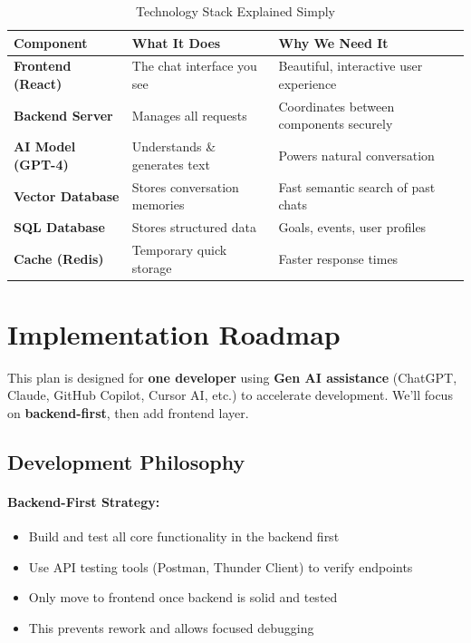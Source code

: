 \documentclass[12pt,a4paper]{article}
\begin{document}
\begin{table}[h]
\centering
\begin{tabularx}{\textwidth}{|l|X|X|}
\hline
\textbf{Component} & \textbf{What It Does} & \textbf{Why We Need It} \\
\hline
\textbf{Frontend (React)} & The chat interface you see & Beautiful, interactive user experience \\
\hline
\textbf{Backend Server} & Manages all requests & Coordinates between components securely \\
\hline
\textbf{AI Model (GPT-4)} & Understands \& generates text & Powers natural conversation \\
\hline
\textbf{Vector Database} & Stores conversation memories & Fast semantic search of past chats \\
\hline
\textbf{SQL Database} & Stores structured data & Goals, events, user profiles \\
\hline
\textbf{Cache (Redis)} & Temporary quick storage & Faster response times \\
\hline
\end{tabularx}
\caption{Technology Stack Explained Simply}
\end{table}

\section{Implementation Roadmap}

\begin{tcolorbox}[colback=yellow!10,colframe=orange,title=\textbf{Solo Developer Approach}]
This plan is designed for \textbf{one developer} using \textbf{Gen AI assistance} (ChatGPT, Claude, GitHub Copilot, Cursor AI, etc.) to accelerate development. We'll focus on \textbf{backend-first}, then add frontend layer.
\end{tcolorbox}

\subsection{Development Philosophy}

\paragraph{Backend-First Strategy:}
\begin{itemize}[leftmargin=*]
    \item Build and test all core functionality in the backend first
    \item Use API testing tools (Postman, Thunder Client) to verify endpoints
    \item Only move to frontend once backend is solid and tested
    \item This prevents rework and allows focused debugging
\end{itemize}
\end{document}
